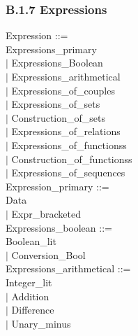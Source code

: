 \documentclass[12pt,a4paper,draft]{report}
\begin{document}
{\begin{sloppypar}
\subsubsection{B.1.7 Expressions }
\noindent Expression ::= \\
\hspace*{0.20in}   Expressions\_primary\\
\hspace*{0.20in} $|$  Expressions\_Boolean\\
\hspace*{0.20in} $|$  Expressions\_arithmetical\\
\hspace*{0.20in} $|$  Expressions\_of\_couples\\
\hspace*{0.20in} $|$  Expressions\_of\_sets\\
\hspace*{0.20in} $|$  Construction\_of\_sets\\
\hspace*{0.20in} $|$  Expressions\_of\_relations\\
\hspace*{0.20in} $|$  Expressions\_of\_functionss\\
\hspace*{0.20in} $|$  Construction\_of\_functionss\\
\hspace*{0.20in} $|$  Expressions\_of\_sequences\\
Expression\_primary ::= \\
\hspace*{0.20in}   Data\\
\hspace*{0.20in} $|$  Expr\_bracketed\\
Expressions\_boolean ::= \\
\hspace*{0.20in}   Boolean\_lit\\
\hspace*{0.20in} $|$  Conversion\_Bool\\
Expressions\_arithmetical ::= \\
\hspace*{0.20in}  Integer\_lit \\
\hspace*{0.20in} $|$  Addition\\
\hspace*{0.20in} $|$  Difference\\
\hspace*{0.20in} $|$  Unary\_minus\\

\end{sloppypar}}
\end{document}
